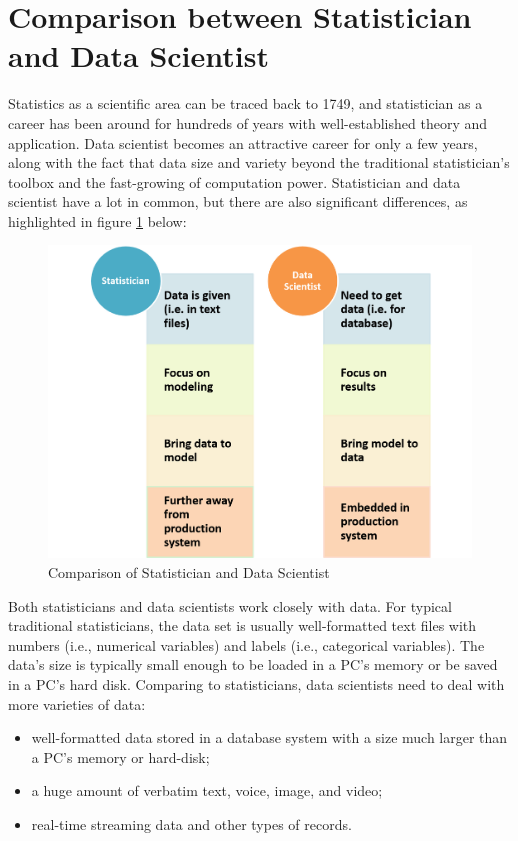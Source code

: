 \documentclass[
  12pt,
]{krantz}
\providecommand{\tightlist}{%
  \setlength{\itemsep}{0pt}\setlength{\parskip}{0pt}}
\begin{document}
\hypertarget{comparison-between-statistician-and-data-scientist}{%
\section{Comparison between Statistician and Data Scientist}\label{comparison-between-statistician-and-data-scientist}}

Statistics as a scientific area can be traced back to 1749, and statistician as a career has been around for hundreds of years with well-established theory and application. Data scientist becomes an attractive career for only a few years, along with the fact that data size and variety beyond the traditional statistician's toolbox and the fast-growing of computation power. Statistician and data scientist have a lot in common, but there are also significant differences, as highlighted in figure \ref{fig:softskill1} below:

\begin{figure}

{\centering \includegraphics[width=0.8\linewidth]{images/softskill1} 

}

\caption{Comparison of Statistician and Data Scientist}\label{fig:softskill1}
\end{figure}

Both statisticians and data scientists work closely with data. For typical traditional statisticians, the data set is usually well-formatted text files with numbers (i.e., numerical variables) and labels (i.e., categorical variables). The data's size is typically small enough to be loaded in a PC's memory or be saved in a PC's hard disk. Comparing to statisticians, data scientists need to deal with more varieties of data:

\begin{itemize}
\tightlist
\item
  well-formatted data stored in a database system with a size much larger than a PC's memory or hard-disk;
\item
  a huge amount of verbatim text, voice, image, and video;
\item
  real-time streaming data and other types of records.
\end{itemize}
\end{document}
